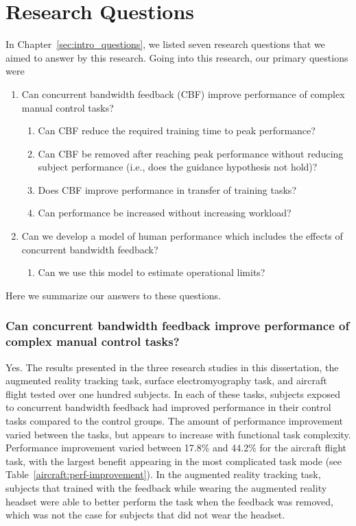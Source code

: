 \section{Research Questions}

In Chapter~\ref{sec:intro_questions}, we listed seven research questions that we aimed to answer by this research.
Going into this research, our primary questions were
\begin{enumerate}
    \item Can concurrent bandwidth feedback (CBF) improve performance of complex manual control tasks?
          \begin{enumerate}
              \item Can CBF reduce the required training time to peak performance?
              \item Can CBF be removed after reaching peak performance without reducing subject performance (i.e., does the guidance hypothesis not hold)?
              \item Does CBF improve performance in transfer of training tasks?
              \item Can performance be increased without increasing workload?
          \end{enumerate}
    \item Can we develop a model of human performance which includes the effects of concurrent bandwidth feedback?
          \begin{enumerate}
              \item Can we use this model to estimate operational limits?
          \end{enumerate}
\end{enumerate}
Here we summarize our answers to these questions.

\subsubsection{Can concurrent bandwidth feedback improve performance of complex manual control tasks?}
Yes.
The results presented in the three research studies in this dissertation, the augmented reality tracking task, surface electromyography task, and aircraft flight tested over one hundred subjects.
In each of these tasks, subjects exposed to concurrent bandwidth feedback had improved performance in their control tasks compared to the control groups.
The amount of performance improvement varied between the tasks, but appears to increase with functional task complexity.
Performance improvement varied between 17.8\% and 44.2\% for the aircraft flight task, with the largest benefit appearing in the most complicated task mode (see Table~\ref{aircraft:perf-improvement}).
In the augmented reality tracking task, subjects that trained with the feedback while wearing the augmented reality headset were able to better perform the task when the feedback was removed, which was not the case for subjects that did not wear the headset.

